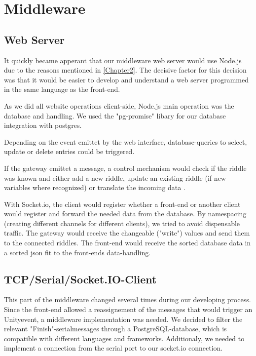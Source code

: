 \section{Middleware}

\subsection{Web Server}
It quickly became apperant that our middleware web server would use Node.js due to the reasons mentioned in \ref{Chapter2}.
The decisive factor for this decision was that it would be easier to develop and understand a web server programmed in the same language as the front-end.

As we did all website operations client-side, Node.js main operation was the database and handling. 
We used the "pg-promise" libary \parencite{pg-promise} for our database integration with postgres. 

Depending on the event emittet by the web interface, database-queries to select, update or delete entries could be triggered.

If the gateway emittet a message, a control mechanism would check if the riddle was known and either add a new riddle, update an existing riddle (if new variables where recognized) or translate the incoming data .

With Socket.io, the client would register whether a front-end or another client would register and forward the needed data from the database. 
By namespacing (creating different channels for different clients), we tried to avoid dispensable traffic.
The gateway would receive the changeable ("write") values and send them to the connected riddles.
The front-end would receive the sorted database data in a sorted json fit to the front-ends data-handling.

\subsection{TCP/Serial/Socket.IO-Client}
This part of the middleware changed several times during our developing process. 
Since the front-end allowed a reassignement of the messages that would trigger an Unityevent, a middleware implementation was needed.
We decided to filter the relevant "Finish"-serialmessages through a PostgreSQL-database, which is compatible with different languages and frameworks.
Additionaly, we needed to implement a connection from the serial port to our socket.io connection.

